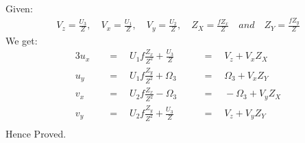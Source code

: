 \documentclass{article}
\begin{document}
Given:
\begin{align*}
  V_z = \frac{U_3}{Z}, \quad V_x = \frac{U_1}{Z}, \quad V_y = \frac{U_2}{Z},
  \quad Z_X = \frac{fZ_x}{Z} \quad\textit{and}\quad Z_Y = \frac{fZ_y}{Z}
\end{align*}
We get:
\begin{alignat*}{3}
u_x \quad &= \quad U_1f\frac{Z_x}{Z^2} + \frac{U_3}{Z} \quad &&= \quad V_z + V_xZ_X\\
u_y \quad &= \quad U_1f\frac{Z_y}{Z^2} + \Omega_3 \quad &&= \quad \Omega_3 + V_xZ_Y\\
v_x \quad &= \quad U_2f\frac{Z_x}{Z^2} - \Omega_3 \quad &&= \quad -\Omega_3 + V_yZ_X\\
v_y \quad &= \quad U_2f\frac{Z_y}{Z^2} + \frac{U_3}{Z} \quad &&= \quad V_z + V_yZ_Y\\
\end{alignat*}
Hence Proved.
\end{document}
